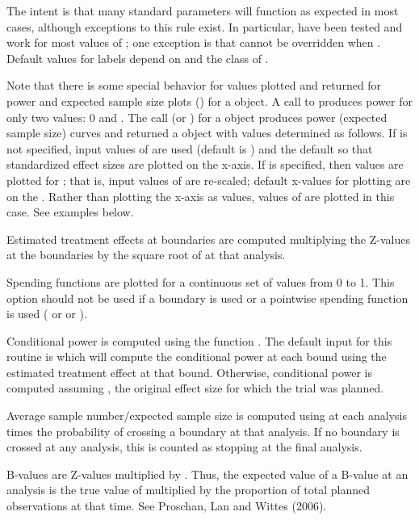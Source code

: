 \begin{Details}\relax
The intent is that many standard  parameters will function as expected in most cases, although exceptions to this rule exist.
In particular,  have been tested and work for most values of ; one
exception is that  cannot be overridden when . Default values for labels depend on  and 
the class of .


Note that there is some special behavior for values plotted and returned 
for power and expected sample size plots () for a  object.
A call to  produces power for only two  values: 0 and . 
The call  (or ) for a  object 
produces power (expected sample size) curves and returned a  object with  values determined as follows. 
If  is not specified, input values of  are used (default is ) 
and the default  so that standardized effect sizes are plotted on the x-axis.
If  is specified, then values are plotted for ; that is, input values of  are re-scaled; 
default x-values for plotting are on the .
Rather than plotting the x-axis
as  values, values of  are plotted in this case.  
See examples below.

Estimated treatment effects at boundaries are computed multiplying the Z-values at the boundaries by
the square root of  at that analysis. 

Spending functions are plotted for a continuous set of values from 0 to 1. 
This option should not be used if a boundary is used or a pointwise spending function is used
( or  or ). 

Conditional power is computed using the function . 
The default input for this routine is  which will compute the conditional power
at each bound using the estimated treatment effect at that bound. 
Otherwise, conditional power is computed assuming , 
the original effect size for which the trial was planned.

Average sample number/expected sample size is computed using  at each analysis times 
the probability of crossing a boundary at that analysis.
If no boundary is crossed at any analysis, this is counted as stopping at the final analysis.

B-values are Z-values multiplied by . 
Thus, the expected value of a B-value at an analysis is the true value of 
 multiplied by the proportion of total planned observations at that time.
See Proschan, Lan and Wittes (2006).
\end{Details}

